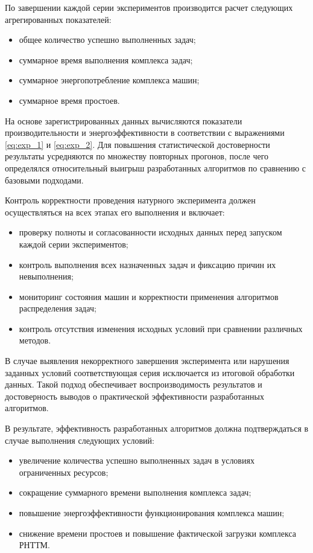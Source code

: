 По завершении каждой серии экспериментов производится расчет следующих агрегированных показателей:
\begin{itemize}[beginpenalty=10000, midpenalty=10000, wide=\parindent, leftmargin=0pt]
	\item общее количество успешно выполненных задач;
	\item суммарное время выполнения комплекса задач;
	\item суммарное энергопотребление комплекса машин;
	\item суммарное время простоев.
\end{itemize}

На основе зарегистрированных данных вычисляются показатели производительности и энергоэффективности в соответствии с выражениями \ref{eq:exp_1} и \ref{eq:exp_2}. Для повышения статистической достоверности результаты усредняются по множеству повторных прогонов, после чего определялся относительный выигрыш разработанных алгоритмов по сравнению с базовыми подходами.

Контроль корректности проведения натурного эксперимента должен осуществляться на всех этапах его выполнения и включает:
\begin{itemize}[beginpenalty=10000, midpenalty=10000, wide=\parindent, leftmargin=0pt]
	\item проверку полноты и согласованности исходных данных перед запуском каждой серии экспериментов;
	\item контроль выполнения всех назначенных задач и фиксацию причин их невыполнения;
	\item мониторинг состояния машин и корректности применения алгоритмов распределения задач;
	\item контроль отсутствия изменения исходных условий при сравнении различных методов.
\end{itemize}

В случае выявления некорректного завершения эксперимента или нарушения заданных условий соответствующая серия исключается из итоговой обработки данных. Такой подход обеспечивает воспроизводимость результатов и достоверность выводов о практической эффективности разработанных алгоритмов.

В результате, эффективность разработанных алгоритмов должна подтверждаться в случае выполнения следующих условий:
\begin{itemize}[beginpenalty=10000, midpenalty=10000, wide=\parindent, leftmargin=0pt]
	\item увеличение количества успешно выполненных задач в условиях ограниченных ресурсов;
	\item сокращение суммарного времени выполнения комплекса задач;
	\item повышение энергоэффективности функционирования комплекса машин;
	\item снижение времени простоев и повышение фактической загрузки комплекса РНТТМ.
\end{itemize}

